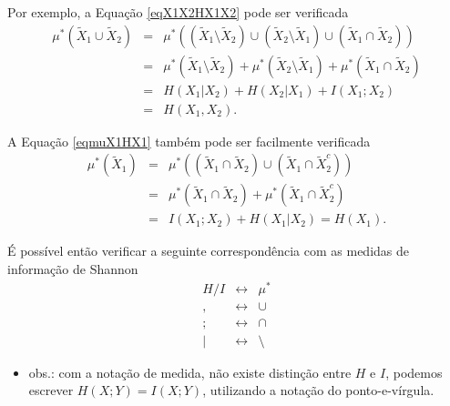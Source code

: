 \begin{frame}[allowframebreaks]
  Por exemplo, a Equação \ref{eqX1X2HX1X2} pode ser verificada
  \begin{eqnarray}
  \mu^\ast(\tilde{X}_1 \cup \tilde{X}_2) &=& \mu^\ast( (\tilde{X}_1 \setminus \tilde{X}_2) \cup (\tilde{X}_2 \setminus \tilde{X}_1) \cup (\tilde{X}_1 \cap \tilde{X}_2) ) \nonumber \\
	&=& \mu^\ast( \tilde{X}_1 \setminus \tilde{X}_2 ) + \mu^\ast( \tilde{X}_2 \setminus \tilde{X}_1 ) + \mu^\ast( \tilde{X}_1 \cap \tilde{X}_2 ) \nonumber \\
	&=& H(X_1|X_2) + H(X_2|X_1) + I(X_1;X_2) \nonumber \\
	&=& H(X_1, X_2) .
  \end{eqnarray}

  A Equação \ref{eqmuX1HX1} também pode ser facilmente verificada
  \begin{eqnarray}
  \mu^\ast(\tilde{X}_1) &=& \mu^\ast( (\tilde{X}_1 \cap \tilde{X}_2) \cup (\tilde{X}_1 \cap \tilde{X}_2^c) ) \nonumber \\
	&=& \mu^\ast(\tilde{X}_1 \cap \tilde{X}_2) + \mu^\ast(\tilde{X}_1 \cap \tilde{X}_2^c) \nonumber \\
	&=& I(X_1;X_2) + H(X_1|X_2) = H(X_1) .
  \end{eqnarray}

  É possível então verificar a seguinte correspondência com as medidas de informação de Shannon
  \begin{eqnarray}
  H / I &\leftrightarrow& \mu^\ast \\
  , &\leftrightarrow& \cup \\
  ; &\leftrightarrow& \cap \\
  | &\leftrightarrow& \setminus 
  \end{eqnarray}

  \begin{itemize}
  \item obs.: com a notação de medida, não existe distinção entre $H$ e $I$, podemos escrever
	$H(X;Y) = I(X;Y)$, utilizando a notação do ponto-e-vírgula.
  \end{itemize}
\end{frame}



